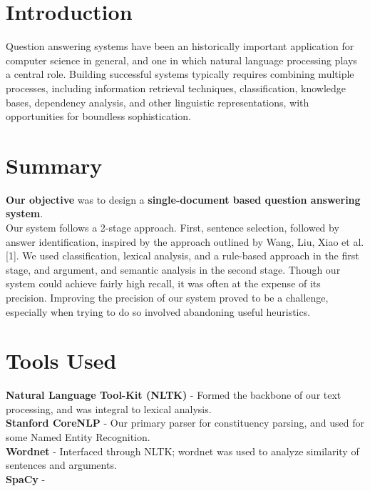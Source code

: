 \documentclass[a1,landscape]{a0poster}
\begin{document}
\begin{multicols}{3} %


\color{Navy} %
\section*{\large Introduction}
Question answering systems have been an historically important application for computer science in general, and one in which natural language processing plays a central role. Building successful systems typically requires combining multiple processes, including information retrieval techniques, classification, knowledge bases, dependency analysis, and other linguistic representations, with opportunities for boundless sophistication. 


\color{SaddleBrown} %

\section*{\large Summary}
\textbf{Our objective} was to design a \textbf{single-document based question answering system}.\\
Our system follows a 2-stage approach. First, sentence selection, followed by answer identification, inspired by the approach outlined by Wang, Liu, Xiao et al.[1]. We used classification, lexical analysis, and a rule-based approach in the first stage, and argument, and semantic analysis in the second stage. Though our system could achieve fairly high recall, it was often at the expense of its precision. Improving the precision of our system proved to be a challenge, especially when trying to do so involved abandoning useful heuristics. 

\color{DarkSlateGray} %

\section*{\large Tools Used}
\textbf{Natural Language Tool-Kit (NLTK)} - Formed the backbone of our text processing, and was integral to lexical analysis. \\
\textbf{Stanford CoreNLP} - Our primary parser for constituency parsing, and used for some Named Entity Recognition.\\
\textbf{Wordnet} - Interfaced through NLTK; wordnet was used to analyze similarity of sentences and arguments. \\
\textbf{SpaCy} - 


\end{multicols}
\end{document}
